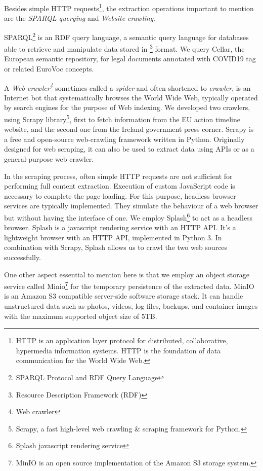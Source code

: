 Besides simple HTTP requests\footnote{ HTTP is an application layer protocol for distributed, collaborative, hypermedia information systems. HTTP is the foundation of data communication for the World Wide Web. }, the extraction operations important to mention are the \textit{SPARQL querying} and \textit{Website crawling}. 

SPARQL\footnote{ SPARQL Protocol and RDF Query Language } is an RDF query language, a semantic query language for databases able to retrieve and manipulate data stored in \footnote{ Resource Description Framework (RDF) } format. We query Cellar, the European semantic repository, for legal documents annotated with COVID19 tag or related EuroVoc concepts. 

A \textit{Web crawler\footnote{ Web crawler }} sometimes called a \textit{spider} and often shortened to \textit{crawler}, is an Internet bot that systematically browses the World Wide Web, typically operated by search engines for the purpose of Web indexing. We developed two crawlers, using Scrapy library\footnote{ Scrapy, a fast high-level web crawling $\&$  scraping framework for Python. }, first to fetch information from the EU action timeline website, and the second one from the Ireland government press corner. Scrapy is a free and open-source web-crawling framework written in Python. Originally designed for web scraping, it can also be used to extract data using APIs or as a general-purpose web crawler.

In the scraping process, often simple HTTP requests are not sufficient for performing full content extraction. Execution of custom JavaScript code is necessary to complete the page loading. For this purpose, headless browser services are typically implemented. They simulate the behaviour of a web browser but without having the interface of one. We employ Splash\footnote{ Splash javascript rendering service } to act as a headless browser. Splash is a javascript rendering service with an HTTP API. It's a lightweight browser with an HTTP API, implemented in Python 3. In combination with Scrapy, Splash allows us to crawl the two web sources successfully. 

One other aspect essential to mention here is that we employ an object storage service called Minio\footnote{ MinIO is an open source implementation of the Amazon S3 storage system.  } for the temporary persistence of the extracted data. MinIO is an Amazon S3 compatible server-side software storage stack. It can handle unstructured data such as photos, videos, log files, backups, and container images with the maximum supported object size of 5TB.


